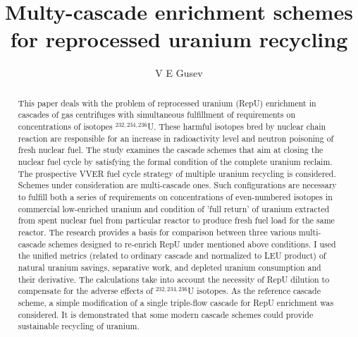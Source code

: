 \documentclass[a4paper]{jpconf}
\begin{document}
\title{Multy-cascade enrichment schemes for reprocessed uranium recycling}
\author{V E Gusev}
\address{National Research Nuclear University “MEPhI”, Department of Molecular Physics, 115409, Russia, Moscow, Kashirskoe shosse, 31}

\begin{abstract}
This paper deals with the problem of reprocessed uranium (RepU) enrichment in cascades of gas centrifuges with simultaneous fulfillment of requirements on concentrations of isotopes $^{232,234,236}$U. These harmful isotopes bred by nuclear chain reaction are responsible for an increase in radioactivity level and neutron poisoning of fresh nuclear fuel.
The study examines the cascade schemes that aim at closing the nuclear fuel cycle by satisfying the formal condition of the complete uranium reclaim. The prospective VVER fuel cycle strategy of multiple uranium recycling is considered. Schemes under consideration are multi-cascade ones. Such configurations are necessary to fulfill both a series of requirements on concentrations of even-numbered isotopes in commercial low-enriched uranium and condition of 'full return' of uranium extracted from spent nuclear fuel from particular reactor to produce fresh fuel load for the same reactor.
The research provides a basis for comparison between three various multi-cascade schemes designed to re-enrich RepU under mentioned above conditions. I used the unified metrics (related to ordinary cascade and normalized to LEU product) of natural uranium savings, separative work, and depleted uranium consumption and their derivative. The calculations take into account the necessity of RepU dilution to compensate for the adverse effects of $^{232,234,236}$U isotopes. As the reference cascade scheme, a simple modification of a single triple-flow cascade for RepU enrichment was considered. It is demonstrated that some modern cascade schemes could provide sustainable recycling of uranium.
\end{abstract}
\end{document}
